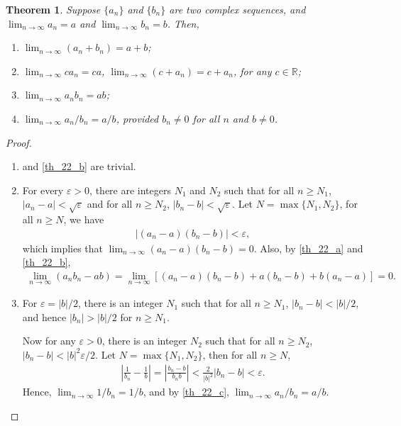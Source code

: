 \documentclass[10pt]{book}
\newtheorem{theorem}{Theorem}[chapter]
\theoremstyle{definition}
\numberwithin{equation}{chapter}
\begin{document}
\begin{theorem}\label{th_22}
Suppose $\{a_n\}$ and $\{b_n\}$ are two complex sequences, and $\lim_{n\to\infty} a_n = a$ and $\lim_{n\to\infty} b_n = b$. Then,
\begin{enumerate}[label=(\alph*)]
    \item $\lim_{n\to\infty} (a_n + b_n) = a + b$; \label{th_22_a}
    
    \item $\lim_{n\to\infty} c a_n = ca$, $\lim_{n\to\infty} (c + a_n) = c + a_n$, for any $c \in \mathbb{R}$; \label{th_22_b}
    
    \item $\lim_{n\to\infty} a_n b_n = ab$; \label{th_22_c}
    
    \item $\lim_{n\to\infty} a_n/b_n = a/b$, provided $b_n \neq 0$ for all $n$ and $b \neq 0$. \label{th_22_d}
\end{enumerate}
\end{theorem}
\begin{proof}
~\begin{enumerate}[label=(\alph*)]
    \item and \ref{th_22_b} are trivial.
    
    \setcounter{enumi}{2}
    \item For every $\varepsilon > 0$, there are integers $N_1$ and $N_2$ such that for all $n \geq N_1$, $\left|a_n - a\right| < \sqrt{\varepsilon}$ and for all $n \geq N_2$, $\left|b_n - b\right| < \sqrt{\varepsilon}$. Let $N = \max \{N_1, N_2\}$, for all $n \geq N$, we have
    \begin{align*}
        \left|(a_n - a)(b_n - b)\right| < \varepsilon,
    \end{align*}
    which implies that $\lim_{n\to\infty} (a_n - a)(b_n - b) = 0$. Also, by \ref{th_22_a} and \ref{th_22_b},
    \begin{align*}
        \lim_{n\to\infty} (a_nb_n - ab) = \lim_{n\to\infty} \left[(a_n - a)(b_n - b) + a(b_n - b) + b(a_n - a)\right] = 0.
    \end{align*}
    
    \item For $\varepsilon = \left|b\right|/2$, there is an integer $N_1$ such that for all $n \geq N_1$, $ \left|b_n - b\right| < \left|b\right|/2$, and hence $\left|b_n\right| > \left|b\right|/2$ for $n \geq N_1$. 
    
    Now for any $\varepsilon > 0$, there is an integer $N_2$ such that for all $n \geq N_2$, $\left|b_n - b\right| < \left|b\right|^2\varepsilon/2$. Let $N = \max \{N_1, N_2\}$, then for all $n \geq N$, 
    \begin{align*}
        \left|\frac{1}{b_n} - \frac{1}{b}\right| = \left|\frac{b_n - b}{b_n b}\right| < \frac{2}{\left|b\right|^2} \left|b_n - b\right| < \varepsilon.
    \end{align*}
    Hence, $\lim_{n\to\infty} 1/b_n = 1/b$, and by \ref{th_22_c}, $\lim_{n\to\infty} a_n/b_n = a/b$.
\end{enumerate}
\end{proof}
\end{document}
